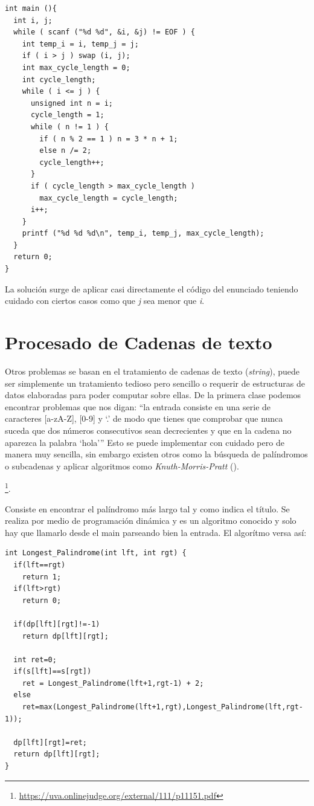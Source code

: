 \begin{lstlisting}
int main (){
  int i, j;
  while ( scanf ("%d %d", &i, &j) != EOF ) {
    int temp_i = i, temp_j = j;
    if ( i > j ) swap (i, j);
    int max_cycle_length = 0;
    int cycle_length;
    while ( i <= j ) {
      unsigned int n = i;
      cycle_length = 1;
      while ( n != 1 ) {
        if ( n % 2 == 1 ) n = 3 * n + 1;
        else n /= 2;
        cycle_length++;
      }
      if ( cycle_length > max_cycle_length )
        max_cycle_length = cycle_length;
      i++;
    }
    printf ("%d %d %d\n", temp_i, temp_j, max_cycle_length);
  }
  return 0;
}
\end{lstlisting}

La solución surge de aplicar casi directamente el código del enunciado
teniendo cuidado con ciertos casos como que \emph{j} sea menor que \emph{i}.


\section{Procesado de Cadenas de texto}
\label{sec:texto}

Otros problemas se basan en el tratamiento de cadenas de texto
(\emph{string}), puede ser simplemente un tratamiento tedioso pero
sencillo o requerir de estructuras de datos elaboradas para poder
computar sobre ellas. De la primera clase podemos encontrar problemas
que nos digan: ``la entrada consiste en una serie de caracteres
[a-zA-Z], [0-9] y ‘.’ de modo que tienes que comprobar que nunca
suceda que dos números consecutivos sean decrecientes y que en la
cadena no aparezca la palabra ‘hola’'' Esto se puede implementar con
cuidado pero de manera muy sencilla, sin embargo existen otros como la
búsqueda de palíndromos o subcadenas y aplicar algoritmos como
\emph{Knuth-Morris-Pratt} ().

\footnote{\url{https://uva.onlinejudge.org/external/111/p11151.pdf}}.

Consiste en encontrar el palíndromo más largo tal y como indica el
título. Se realiza por medio de programación dinámica y es un
algoritmo conocido y solo hay que llamarlo desde el main parseando
bien la entrada. El algorítmo versa así:

\begin{lstlisting}
int Longest_Palindrome(int lft, int rgt) {
  if(lft==rgt) 
    return 1;
  if(lft>rgt) 
    return 0;

  if(dp[lft][rgt]!=-1) 
    return dp[lft][rgt];

  int ret=0;
  if(s[lft]==s[rgt])
    ret = Longest_Palindrome(lft+1,rgt-1) + 2;
  else
    ret=max(Longest_Palindrome(lft+1,rgt),Longest_Palindrome(lft,rgt-1));
 
  dp[lft][rgt]=ret;
  return dp[lft][rgt];
}
\end{lstlisting}


